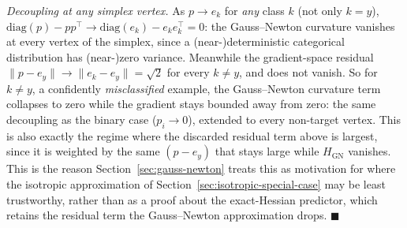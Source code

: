 \documentclass{article}
\begin{document}
\emph{Decoupling at any simplex vertex.} As $p\to e_k$ for \emph{any} class $k$ (not only $k=y$), $\mathrm{diag}(p)-pp^\top \to \mathrm{diag}(e_k) - e_ke_k^\top = 0$: the Gauss--Newton curvature vanishes at every vertex of the simplex, since a (near-)deterministic categorical distribution has (near-)zero variance. Meanwhile the gradient-space residual $\|p-e_y\|\to\|e_k-e_y\|=\sqrt{2}$ for every $k\ne y$, and does not vanish. So for $k\ne y$, a confidently \emph{misclassified} example, the Gauss--Newton curvature term collapses to zero while the gradient stays bounded away from zero: the same decoupling as the binary case ($p_i\to 0$), extended to every non-target vertex. This is also exactly the regime where the discarded residual term above is largest, since it is weighted by the same $(p-e_y)$ that stays large while $H_{\mathrm{GN}}$ vanishes. This is the reason Section~\ref{sec:gauss-newton} treats this as motivation for where the isotropic approximation of Section~\ref{sec:isotropic-special-case} may be least trustworthy, rather than as a proof about the exact-Hessian predictor, which retains the residual term the Gauss--Newton approximation drops. $\blacksquare$
\end{document}
